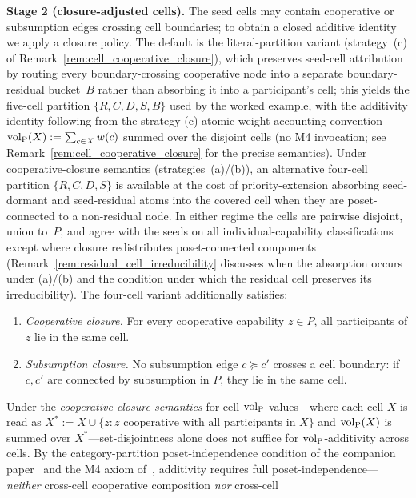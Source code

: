 \begin{definition}
\medskip\noindent
\textbf{Stage 2 (closure-adjusted cells).}
The seed cells may contain cooperative or subsumption edges
crossing cell boundaries; to obtain a closed additive identity
we apply a closure policy.  The default is the literal-partition
variant (strategy~(c) of
Remark~\ref{rem:cell_cooperative_closure}), which preserves
seed-cell attribution by routing every boundary-crossing
cooperative node into a separate boundary-residual bucket~$B$
rather than absorbing it into a participant's cell; this yields
the five-cell partition $\{R, C, D, S, B\}$ used by the worked
example, with the additivity identity following from the
strategy-(c) atomic-weight accounting convention
${\operatorname{vol}_{\mathrm{P}}}(X) := \sum_{c \in X} w(c)$ summed over the disjoint
cells (no M4 invocation; see
Remark~\ref{rem:cell_cooperative_closure} for the precise
semantics).
Under cooperative-closure semantics
(strategies~(a)/(b)), an alternative four-cell partition
$\{R, C, D, S\}$ is available at the cost of priority-extension
absorbing seed-dormant and seed-residual atoms into the covered
cell when they are poset-connected to a non-residual node.  In
either regime the cells are pairwise
disjoint, union to~$P$, and agree with the seeds on all
individual-capability classifications except where closure
redistributes poset-connected components
(Remark~\ref{rem:residual_cell_irreducibility} discusses when
the absorption occurs under (a)/(b) and the condition under
which the residual cell preserves its irreducibility).  The
four-cell variant additionally satisfies:
\begin{enumerate}
\item[(CC1)] \emph{Cooperative closure.}  For every cooperative
  capability $z \in P$, all participants of $z$ lie in the same
  cell.
\item[(CC2)] \emph{Subsumption closure.}  No subsumption edge
  $c \succeq c'$ crosses a cell boundary: if $c, c'$ are
  connected by subsumption in $P$, they lie in the same cell.
\end{enumerate}
Under the \emph{cooperative-closure semantics} for cell
${\operatorname{vol}_{\mathrm{P}}}$ values---where each cell $X$ is read as $X^{*} := X
\cup \{z : z \text{ cooperative with all participants in } X\}$
and ${\operatorname{vol}_{\mathrm{P}}}(X)$ is summed over $X^{*}$---set-disjointness alone
does not suffice for ${\operatorname{vol}_{\mathrm{P}}}$-additivity across cells.  By the
category-partition poset-independence
condition of the companion paper~\citep[Revealed~Sacrifice]{lasser2026paper8a} and
the M4 axiom of~\citep[Proposition~1]{lasser2026poset},
additivity requires full poset-independence---\emph{neither}
cross-cell cooperative composition \emph{nor} cross-cell

\end{definition}

